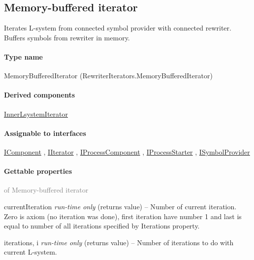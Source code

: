 
\subsection{Memory-buffered iterator}
\label{Malsys.Processing.Components.RewriterIterators.MemoryBufferedIterator}
Iterates L-system from connected symbol provider with connected rewriter.
            Buffers symbols from rewriter in memory.\paragraph{Type name}
MemoryBufferedIterator (RewriterIterators.MemoryBufferedIterator) 	\paragraph{Derived components}
		\hyperref[Malsys.Processing.Components.RewriterIterators.InnerLsystemIterator]{InnerLsystemIterator}%
	\paragraph{Assignable to interfaces}
		\hyperref[Malsys.Processing.Components.IComponent]{IComponent}%
, 		\hyperref[Malsys.Processing.Components.IIterator]{IIterator}%
, 		\hyperref[Malsys.Processing.Components.IProcessComponent]{IProcessComponent}%
, 		\hyperref[Malsys.Processing.Components.IProcessStarter]{IProcessStarter}%
, 		\hyperref[Malsys.Processing.Components.ISymbolProvider]{ISymbolProvider}%
	\paragraph{Gettable properties}\textcolor{gray}{of Memory-buffered iterator}
	\begin{description*}
		\item[currentIteration]
 \textit{run-time only} 		(returns value)
			-- Number of current iteration. Zero is axiom (no iteration was done), first iteration have number 1
            and last is equal to number of all iterations specified by Iterations property.
		\item[iterations, i]
 \textit{run-time only} 		(returns value)
			-- Number of iterations to do with current L-system.
	\end{description*}
